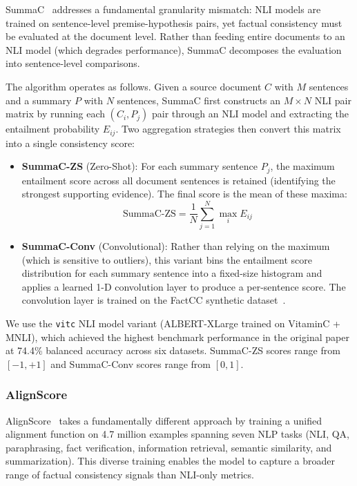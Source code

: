 \documentclass[12pt,a4paper,oneside]{report}
\begin{document}
SummaC~\cite{laban2022summac} addresses a fundamental granularity mismatch: NLI models are trained on sentence-level premise-hypothesis pairs, yet factual consistency must be evaluated at the document level. Rather than feeding entire documents to an NLI model (which degrades performance), SummaC decomposes the evaluation into sentence-level comparisons.

The algorithm operates as follows. Given a source document $C$ with $M$ sentences and a summary $P$ with $N$ sentences, SummaC first constructs an $M \times N$ NLI pair matrix by running each $(C_i, P_j)$ pair through an NLI model and extracting the entailment probability $E_{ij}$. Two aggregation strategies then convert this matrix into a single consistency score:

\begin{itemize}
    \item \textbf{SummaC-ZS} (Zero-Shot): For each summary sentence $P_j$, the maximum entailment score across all document sentences is retained (identifying the strongest supporting evidence). The final score is the mean of these maxima:
    \begin{equation}
        \text{SummaC-ZS} = \frac{1}{N} \sum_{j=1}^{N} \max_{i} E_{ij}
        \label{eq:summac-zs}
    \end{equation}

    \item \textbf{SummaC-Conv} (Convolutional): Rather than relying on the maximum (which is sensitive to outliers), this variant bins the entailment score distribution for each summary sentence into a fixed-size histogram and applies a learned 1-D convolution layer to produce a per-sentence score. The convolution layer is trained on the FactCC synthetic dataset~\cite{laban2022summac}.
\end{itemize}

We use the \texttt{vitc} NLI model variant (ALBERT-XLarge trained on VitaminC + MNLI), which achieved the highest benchmark performance in the original paper at 74.4\% balanced accuracy across six datasets. SummaC-ZS scores range from $[-1, +1]$ and SummaC-Conv scores range from $[0, 1]$.

\subsubsection{AlignScore}

AlignScore~\cite{zha2023alignscore} takes a fundamentally different approach by training a unified alignment function on 4.7 million examples spanning seven NLP tasks (NLI, QA, paraphrasing, fact verification, information retrieval, semantic similarity, and summarization). This diverse training enables the model to capture a broader range of factual consistency signals than NLI-only metrics.
\end{document}
